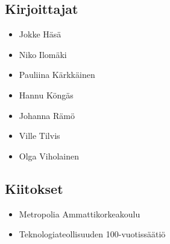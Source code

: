\subsection*{Kirjoittajat}
\begin{itemize}
\item Jokke Häsä
\item Niko Ilomäki
\item Pauliina Kärkkäinen
\item Hannu Köngäs
\item Johanna Rämö
\item Ville Tilvis
\item Olga Viholainen
\end{itemize}

\subsection*{Kiitokset}
\begin{itemize}
\item Metropolia Ammattikorkeakoulu %
\item Teknologiateollisuuden 100-vuotissäätiö %
\end{itemize}
